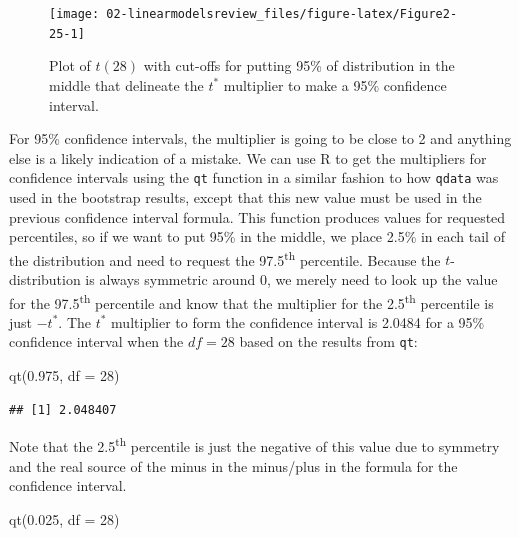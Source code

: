 \documentclass[
]{book}
\newenvironment{Shaded}{\begin{snugshade}}{\end{snugshade}}
\newcommand{\AttributeTok}[1]{\textcolor[rgb]{0.77,0.63,0.00}{#1}}
\newcommand{\DecValTok}[1]{\textcolor[rgb]{0.00,0.00,0.81}{#1}}
\newcommand{\FloatTok}[1]{\textcolor[rgb]{0.00,0.00,0.81}{#1}}
\newcommand{\FunctionTok}[1]{\textcolor[rgb]{0.00,0.00,0.00}{#1}}
\newcommand{\NormalTok}[1]{#1}
\begin{document}
\begin{figure}[ht!]

{\centering \texttt{[image: 02-linearmodelsreview\_files/figure-latex/Figure2-25-1]} 

}

\caption{Plot of \(t(28)\) with cut-offs for putting 95\% of distribution in the middle that delineate the \(t^*\) multiplier to make a 95\% confidence interval.}\label{fig:Figure2-25}
\end{figure}

For 95\% confidence intervals, the multiplier is going to be close to 2 and
anything else is a likely indication of a mistake. We can use R to get the multipliers for
confidence intervals using the \texttt{qt} function in a similar fashion to how
\texttt{qdata} was used in the bootstrap results, except that this new value must be
used in the previous confidence interval formula. This function produces values
for requested percentiles, so if we want to put 95\% in the middle, we place
2.5\% in each tail of the distribution and need to request the 97.5\textsuperscript{th}
percentile. Because the \(t\)-distribution is always symmetric around 0, we merely
need to look up the value for the 97.5\textsuperscript{th} percentile and know that the
multiplier for the 2.5\textsuperscript{th} percentile is just \(-t^*\). The \(t^*\)
multiplier to form the confidence interval is 2.0484 for a 95\% confidence interval
when the \(df = 28\) based on the results from \texttt{qt}:

\begin{Shaded}
\begin{Highlighting}[]
\FunctionTok{qt}\NormalTok{(}\FloatTok{0.975}\NormalTok{, }\AttributeTok{df =} \DecValTok{28}\NormalTok{)}
\end{Highlighting}
\end{Shaded}

\begin{verbatim}
## [1] 2.048407
\end{verbatim}

Note that the 2.5\textsuperscript{th} percentile is just the negative of this value due
to symmetry and the real source of the minus in the minus/plus in the formula
for the confidence interval.

\begin{Shaded}
\begin{Highlighting}[]
\FunctionTok{qt}\NormalTok{(}\FloatTok{0.025}\NormalTok{, }\AttributeTok{df =} \DecValTok{28}\NormalTok{)}
\end{Highlighting}
\end{Shaded}
\end{document}
